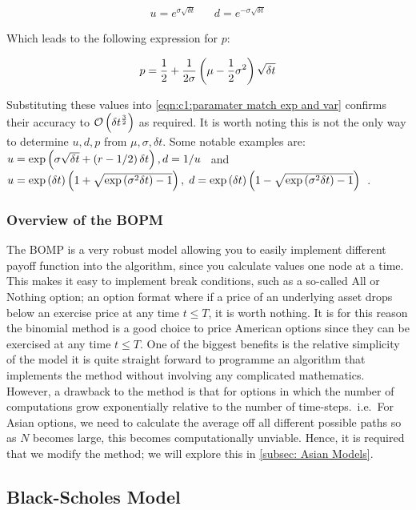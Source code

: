 \begin{align*}
    u = e^{\sigma\sqrt{\delta t}}
    &&
    d = e^{-\sigma\sqrt{\delta t}}
\end{align*}

Which leads to the following expression for \(p \):

\begin{equation*}
    p = \frac{1}{2} + \frac{1}{2\sigma}\left(\mu -\frac{1}{2}\sigma^2\right)\sqrt{\delta t}
\end{equation*}

Substituting these values into \autoref{eqn:c1:paramater match exp and var} confirms their accuracy to \(\mathcal{O}\left(\delta t^\frac{3}{2}\right)\) as required. It is worth noting this is not the only way to determine \(u, d, p\) from \(\mu, \sigma, \delta t\). Some notable examples are: \(u = \exp\left(\sigma\sqrt{\delta t}+\left(r-{1}/{2}\right)\delta t\right), d = {1}/{u}\)~\cite{higham2004introduction} and \(u = \exp\left(\delta t\right)\left(1+\sqrt{\exp\left(\sigma^2\delta t\right)-1}\right), \; d = \exp\left(\delta t\right)\left(1-\sqrt{\exp\left(\sigma^2\delta t\right)-1}\right)\)~\cite{wilmott1995mathematics}.

\subsubsection{Overview of the BOPM}

The BOMP is a very robust model allowing you to easily implement different payoff function into the algorithm, since you calculate values one node at a time. This makes it easy to implement break conditions, such as a so-called All or Nothing option; an option format where if a price of an underlying asset drops below an exercise price at any time \(t \leq T\), it is worth nothing. It is for this reason the binomial method is a good choice to price American options since they can be exercised at any time \(t \leq T\).
\nline{}
One of the biggest benefits is the relative simplicity of the model it is quite straight forward to programme an algorithm that implements the method without involving any complicated mathematics. However, a drawback to the method is that for options in which the number of computations grow exponentially relative to the number of time-steps.~i.e.~For Asian options, we need to calculate the average off all different possible paths so as \(N\) becomes large, this becomes computationally unviable. Hence, it is required that we modify the method; we will explore this in \autoref{subsec: Asian Models}.

\subsection{Black-Scholes Model}

